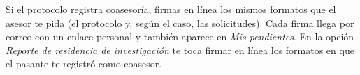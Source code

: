 \documentclass[11pt,a4paper]{article}
\begin{document}
{\small\tableofcontents}
\newpage
\begin{quevasahacer}
Si el protocolo registra coasesoría, firmas en línea los mismos formatos que el asesor te pida (el protocolo y, según el caso, las solicitudes). Cada firma llega por correo con un enlace personal y también aparece en \emph{Mis pendientes}. En la opción \emph{Reporte de residencia de investigación} te toca firmar en línea los formatos en que el pasante te registró como coasesor.
\end{quevasahacer}



\end{document}
